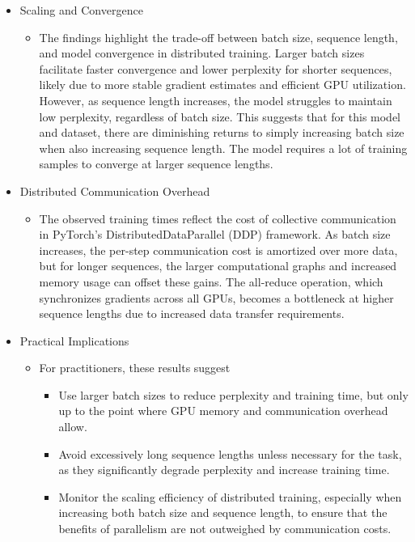 \documentclass[conference]{IEEEtran}
\begin{document}
\begin{itemize}
    \item Scaling and Convergence
    \begin{itemize}
        \item The findings highlight the trade-off between batch size, sequence length, and model convergence in distributed training. Larger batch sizes facilitate faster convergence and lower perplexity for shorter sequences, likely due to more stable gradient estimates and efficient GPU utilization. However, as sequence length increases, the model struggles to maintain low perplexity, regardless of batch size. This suggests that for this model and dataset, there are diminishing returns to simply increasing batch size when also increasing sequence length. The model requires a lot of training samples to converge at larger sequence lengths.
    \end{itemize}
    \item Distributed Communication Overhead
    \begin{itemize}
        \item The observed training times reflect the cost of collective communication in PyTorch's DistributedDataParallel (DDP) framework. As batch size increases, the per-step communication cost is amortized over more data, but for longer sequences, the larger computational graphs and increased memory usage can offset these gains. The all-reduce operation, which synchronizes gradients across all GPUs, becomes a bottleneck at higher sequence lengths due to increased data transfer requirements.
    \end{itemize}
    \item Practical Implications
    \begin{itemize}
        \item For practitioners, these results suggest
        \begin{itemize}
            \item Use larger batch sizes to reduce perplexity and training time, but only up to the point where GPU memory and communication overhead allow.
            \item Avoid excessively long sequence lengths unless necessary for the task, as they significantly degrade perplexity and increase training time.
            \item Monitor the scaling efficiency of distributed training, especially when increasing both batch size and sequence length, to ensure that the benefits of parallelism are not outweighed by communication costs.
        \end{itemize}
    \end{itemize}
\end{itemize}
\end{document}
